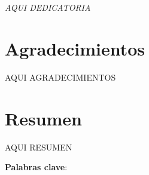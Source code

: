 

\cleardoublepage %
\chapter*{}
\setlength{\leftmargin}{0.5\textwidth}
\setlength{\parsep}{0cm}
\addtolength{\topsep}{0.5cm}
\begin{flushright}
	\small\em{
		AQUI DEDICATORIA
	}
\end{flushright}

 


\chapter*{Agradecimientos}

\thispagestyle{empty}
\vspace{1cm}

AQUI AGRADECIMIENTOS

\cleardoublepage %



\chapter{Resumen}
\thispagestyle{empty}
AQUI RESUMEN

\vspace{1cm}

\textbf{Palabras clave}: 

\cleardoublepage %



